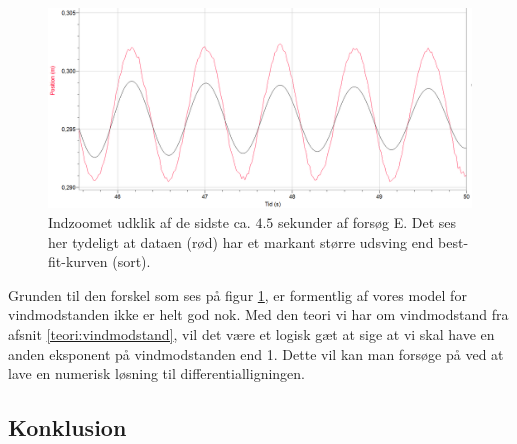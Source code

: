 \begin{figure}[h]
\center
\includegraphics[scale=0.5]{Figurer/Kurvefejl}
\caption{Indzoomet udklik af de sidste ca. $4.5$ sekunder af forsøg E. Det ses her tydeligt at dataen (rød) har et markant større udsving end best-fit-kurven (sort).}
\label{fig: Fejlkurve exp2}
\end{figure}

Grunden til den forskel som ses på figur \ref{fig: Fejlkurve exp2}, er formentlig af vores model for vindmodstanden ikke er helt god nok. 
Med den teori vi har om vindmodstand fra afsnit \ref{teori:vindmodstand}, vil det være et logisk gæt at sige at vi skal have en anden eksponent på vindmodstanden end 1. 
Dette vil kan man forsøge på ved at lave en numerisk løsning til differentialligningen. 





\subsection{Konklusion}


